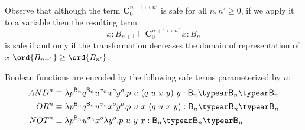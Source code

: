 Observe that although the term $\mathbf{C}^{n+1\mapsto n'}_0$ is safe for all $n,n'\geq 0$, if we apply it to a variable then the resulting term
$$ x:B_{n+1} \vdash \mathbf{C}_0^{n+1\mapsto n'}~x : B_{n}$$
is safe if and only if the transformation decreases the domain of representation of $x$ \ie $\ord{B_{n+1}}\geq\ord{B_{n'}}$.


Boolean functions are encoded by the following safe terms parameterized by $n$:
\begin{align*}
AND^n &\equiv \lambda p^{\booltype_n} q^{\booltype_n} u^{\sigma_n} x^o y^o . p~u~(q~u~x~y)~y : \booltype_n\typear\booltype_n\typear\booltype_n \\
OR^n &\equiv \lambda p^{\booltype_n} q^{\booltype_n} u^{\sigma_n} x^o y^o . p~u~x~(q~u~x~y) : \booltype_n\typear\booltype_{n}\typear\booltype_n \\
NOT^n &\equiv \lambda p^{\booltype_n} u^{\sigma_n} x^o \lambda y^o . p~u~y~x : \booltype_n\typear\booltype_n\typear\booltype_n
\end{align*}

